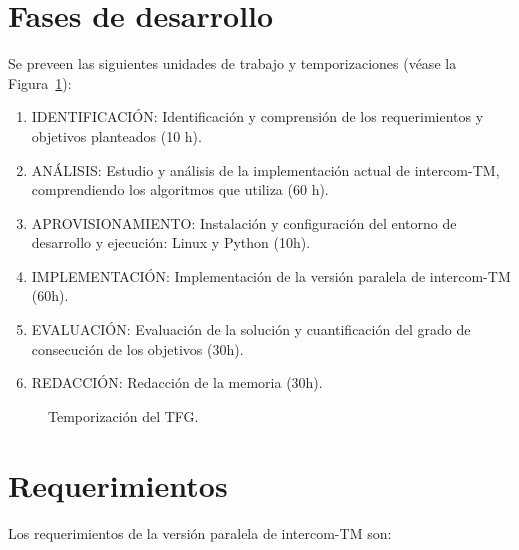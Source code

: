 \documentclass[titlepage, 12pt, a4paper, oneside]{article}
\begin{document}
\section{Fases de desarrollo}
Se preveen las siguientes unidades de trabajo y temporizaciones (véase
la Figura~\ref{fig:temporizacion}):
\begin{enumerate}
  \item {IDENTIFICACIÓN}: Identificación y comprensión de los
    requerimientos y objetivos planteados (10 h).
  \item {ANÁLISIS:} Estudio y análisis de la implementación actual de
    intercom-TM, comprendiendo los algoritmos que utiliza (60 h).
  \item {APROVISIONAMIENTO}: Instalación y configuración del entorno
    de desarrollo y ejecución: Linux y Python (10h).
  \item {IMPLEMENTACIÓN}: Implementación de la versión paralela de
    intercom-TM (60h).
  \item {EVALUACIÓN}: Evaluación de la solución y cuantificación del
    grado de consecución de los objetivos (30h).
  \item {REDACCIÓN}: Redacción de la memoria (30h).
\end{enumerate}

\begin{figure}
  \begin{center}
  \end{center}
  \caption{Temporización del TFG.\label{fig:temporizacion}}
\end{figure}

\section{Requerimientos}
Los requerimientos de la versión paralela de intercom-TM son:
\end{document}
